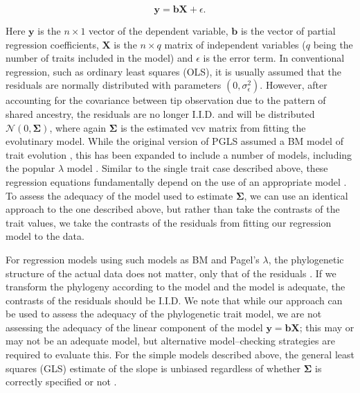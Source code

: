 \documentclass[a4paper,12pt]{article}
\begin{document}
\begin{equation}
\mathbf{y} = \mathbf{b}\mathbf{X} + \epsilon .
\end{equation}

Here $\mathbf{y}$ is the $n \times 1$ vector of the dependent variable, $\mathbf{b}$ is the vector of partial regression coefficients, $\mathbf{X}$ is the $n \times q$ matrix of independent variables ($q$ being the number of traits included in the model) and $\epsilon$ is the error term. In conventional regression, such as ordinary least squares (OLS), it is usually assumed that the residuals are normally distributed with parameters $(0, \sigma_\epsilon^2)$. However, after accounting for the covariance between tip observation due to the pattern of shared ancestry, the residuals are no longer I.I.D. and will be distributed $\mathcal{N} (0, \mathbf{\Sigma})$, where again $\mathbf{\Sigma}$ is the estimated vcv matrix from fitting the evolutinary model. While the original version of PGLS assumed a BM model of trait evolution \citep[in which case it is equivalent to fitting a regression between the contrasts of the two traits][]{Blomberg2012}, this has been expanded to include a number of models, including the popular $\lambda$ model \citep{Pagel1999, Freckleton2002, Revell2010} \citep[see also][]{Lynch1991, Housworth2004, Hadfield2010}. Similar to the single trait case described above, these regression equations fundamentally depend on the use of an appropriate model \citep{Hansen2012}. To assess the adequacy of the model used to estimate $\mathbf{\Sigma}$, we can use an identical approach to the one described above, but rather than take the contrasts of the trait values, we take the contrasts of the residuals from fitting our regression model to the data.

For regression models using such models as BM and Pagel's $\lambda$, the phylogenetic structure of the actual data does not matter, only that of the residuals \citep{Rohlf2001, Revell2010}. If we transform the phylogeny according to the model and the model is adequate, the contrasts of the residuals should be I.I.D. We note that while our approach can be used to assess the adequacy of the phylogenetic trait model, we are not assessing the adequacy of the linear component of the model $\mathbf{y} = \mathbf{b}\mathbf{X}$; this may or may not be an adequate model, but alternative model--checking strategies are required to evaluate this. For the simple models described above, the general least squares (GLS) estimate of the slope is unbiased regardless of whether $\mathbf{\Sigma}$ is correctly specified or not \citep{Rao1999}.
\end{document}
